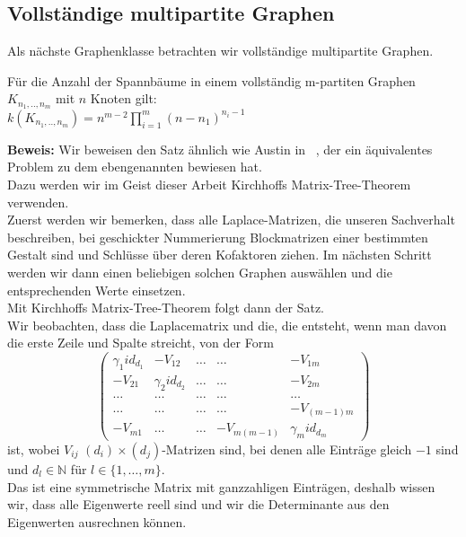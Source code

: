 \subsection{Vollständige multipartite Graphen}
Als nächste Graphenklasse betrachten wir vollständige multipartite Graphen.
\begin{Tms}
 Für die Anzahl der Spannbäume in einem vollständig m-partiten Graphen $K_{n_1,..,n_m}$ mit $n$ Knoten gilt:\\
 $\mathit{k}(K_{n_1,..,n_m})=n^{m-2}\prod_{i=1}^{m}(n-n_1)^{n_i-1}$
\end{Tms}
\textbf{Beweis:}
Wir beweisen den Satz ähnlich wie Austin in ~\cite{austin_1960}, der ein äquivalentes Problem zu dem ebengenannten bewiesen hat.\\
Dazu werden wir im Geist dieser Arbeit Kirchhoffs Matrix-Tree-Theorem verwenden.\\
Zuerst werden wir bemerken, dass alle Laplace-Matrizen, die unseren Sachverhalt beschreiben, bei geschickter Nummerierung Blockmatrizen einer bestimmten Gestalt sind und Schlüsse über deren Kofaktoren ziehen. Im nächsten Schritt werden wir dann einen beliebigen solchen Graphen auswählen und die entsprechenden Werte einsetzen.\\
Mit Kirchhoffs Matrix-Tree-Theorem folgt dann der Satz.\\
Wir beobachten, dass die Laplacematrix und die, die entsteht, wenn man davon die erste Zeile und Spalte streicht, von der Form
\begin{equation}
\begin{pmatrix}
 {\gamma_1}id_{d_1}&-V_{12}&\ldots&\ldots&-V_{1m}\\
 -V_{21}&{\gamma_2}id_{d_2}&\ldots&\ldots&-V_{2m}\\
 \ldots&\ldots&\ldots&\ldots&\ldots\\
  \ldots&\ldots&\ldots&\ldots&-V_{(m-1)m}\\
 -V_{m1}&\ldots&\ldots&-V_{m(m-1)}&{\gamma_m}id_{d_m}
\end{pmatrix}
\end{equation}
ist, wobei $V_{ij}$ $(d_i)\times(d_j)$-Matrizen sind, bei denen alle Einträge gleich $-1$ sind und $d_l\in\mathbb{N}$ für $l\in \{1,\ldots,m\}$.\\
Das ist eine symmetrische Matrix mit ganzzahligen Einträgen, deshalb wissen wir, dass alle Eigenwerte reell sind und wir die Determinante aus den Eigenwerten ausrechnen können.\\
